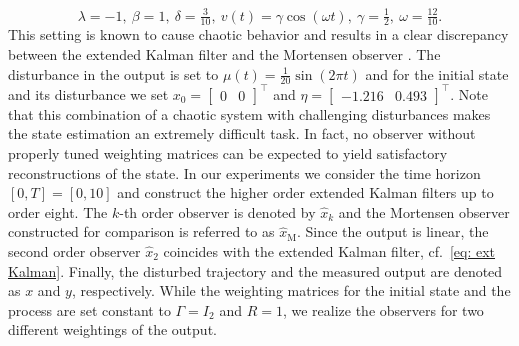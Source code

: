 \documentclass[11pt,reqno]{amsart}
\numberwithin{equation}{section}
\theoremstyle{plain}
\begin{document}
%
\begin{equation*}
	\lambda = -1,~ \beta = 1,~ \delta =\tfrac{3}{10},~ v(t) = \gamma \cos(\omega t),~ \gamma = \tfrac{1}{2},~ \omega = \tfrac{12}{10}.
\end{equation*}
%
This setting is known to cause chaotic behavior \cite{JoSm07,BreKu21} and results in a clear discrepancy between the extended Kalman filter and the Mortensen observer \cite{BreKuSc23}.
The disturbance in the output is set to
$\mu(t) = \tfrac{1}{20} \sin(2 \pi t)$
and for the initial state and its disturbance we set 
$x_0 = \begin{bmatrix}
	0 & 0
\end{bmatrix}^\top$ and $\eta = \begin{bmatrix}
	-1.216 & 0.493
\end{bmatrix}^\top$.
%
Note that this combination of a chaotic system with challenging disturbances makes the state estimation an extremely difficult task. In fact, no observer without properly tuned weighting matrices can be expected to yield satisfactory reconstructions of the state. In our experiments we consider the time horizon $[0,T] = [0,10]$ and construct the higher order extended Kalman filters up to order eight. The $k$-th order observer is denoted by $\widehat{x}_k$ and the Mortensen observer constructed for comparison is referred to as $\widehat{x}_\mathrm{M}$. Since the output is linear, the second order observer $\widehat{x}_2$ coincides with the extended Kalman filter, cf.~\eqref{eq: ext Kalman}. Finally, the disturbed trajectory and the measured output are denoted as $x$ and $y$, respectively.
While the weighting matrices for the initial state and the process are set constant to $\Gamma = I_2$ and $R = 1$, we realize the observers for two different weightings of the output. 
\end{document}
